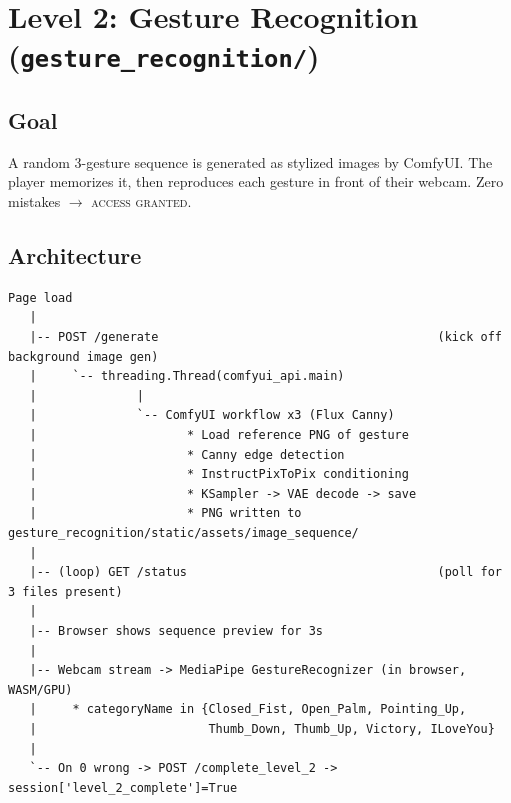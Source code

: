 \documentclass[11pt,a4paper]{article}
\begin{document}
\section{Level 2: Gesture Recognition (\texttt{gesture\_recognition/})}

\subsection{Goal}
A random 3-gesture sequence is generated as stylized images by ComfyUI. The
player memorizes it, then reproduces each gesture in front of their webcam.
Zero mistakes \(\rightarrow\) \textsc{access granted}.

\subsection{Architecture}
\begin{lstlisting}
Page load
   |
   |-- POST /generate                                       (kick off background image gen)
   |     `-- threading.Thread(comfyui_api.main)
   |              |
   |              `-- ComfyUI workflow x3 (Flux Canny)
   |                     * Load reference PNG of gesture
   |                     * Canny edge detection
   |                     * InstructPixToPix conditioning
   |                     * KSampler -> VAE decode -> save
   |                     * PNG written to gesture_recognition/static/assets/image_sequence/
   |
   |-- (loop) GET /status                                   (poll for 3 files present)
   |
   |-- Browser shows sequence preview for 3s
   |
   |-- Webcam stream -> MediaPipe GestureRecognizer (in browser, WASM/GPU)
   |     * categoryName in {Closed_Fist, Open_Palm, Pointing_Up,
   |                        Thumb_Down, Thumb_Up, Victory, ILoveYou}
   |
   `-- On 0 wrong -> POST /complete_level_2 -> session['level_2_complete']=True
\end{lstlisting}
\end{document}
